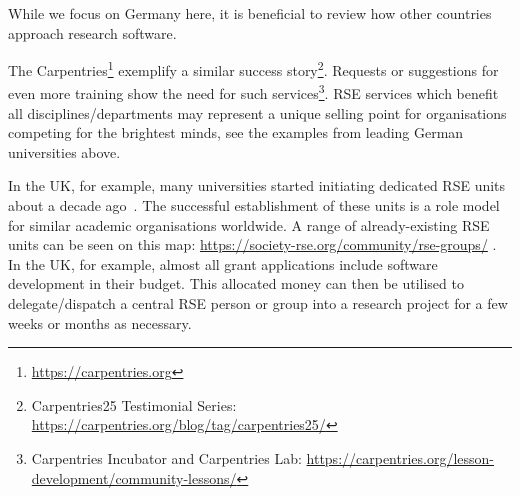 \documentclass[a4paper]{article}
\begin{document}
While we focus on Germany here, it is beneficial to review how other countries approach research software.


 The Carpentries\footnote{\url{https://carpentries.org}}\autocite{Wilson2006} exemplify a similar success story\footnote{Carpentries25 Testimonial Series: \url{https://carpentries.org/blog/tag/carpentries25/}}.
 Requests or suggestions for even more training show the need for such services\footnote{Carpentries Incubator and Carpentries Lab: \url{https://carpentries.org/lesson-development/community-lessons/}}.
RSE services which benefit all disciplines/departments may represent a unique selling point for organisations competing for the brightest minds, see the examples from leading German universities above.


In the UK, for example, many universities started initiating dedicated RSE units about a decade ago~\autocite{Crouch2013}.
The successful establishment of these units is a role model for similar academic organisations worldwide.
A range of already-existing RSE units can be seen on this map: \url{https://society-rse.org/community/rse-groups/} .
In the UK, for example, almost all grant applications include software development in their budget.
This allocated money can then be utilised to delegate/dispatch a central RSE person or group into a research project for a few weeks or months as necessary.
\end{document}
